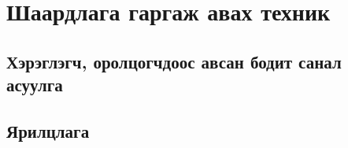 \section{Шаардлага гаргаж авах техник}
\subsection{Хэрэглэгч, оролцогчдоос авсан бодит санал асуулга}
\subsection{Ярилцлага}


